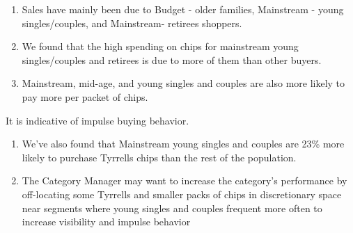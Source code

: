 \documentclass[
]{article}
\begin{document}
\begin{enumerate}
\def\labelenumi{\arabic{enumi}.}
\item
  Sales have mainly been due to Budget - older families, Mainstream -
  young singles/couples, and Mainstream- retirees shoppers.
\item
  We found that the high spending on chips for mainstream young
  singles/couples and retirees is due to more of them than other buyers.
\item
  Mainstream, mid-age, and young singles and couples are also more
  likely to pay more per packet of chips.
\end{enumerate}

It is indicative of impulse buying behavior.

\begin{enumerate}
\def\labelenumi{\arabic{enumi}.}
\setcounter{enumi}{3}
\item
  We've also found that Mainstream young singles and couples are 23\%
  more likely to purchase Tyrrells chips than the rest of the
  population.
\item
  The Category Manager may want to increase the category's performance
  by off-locating some Tyrrells and smaller packs of chips in
  discretionary space near segments where young singles and couples
  frequent more often to increase visibility and impulse behavior
\end{enumerate}
\end{document}
